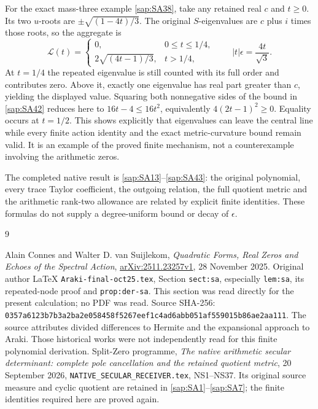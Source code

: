 \documentclass[11pt]{article}
\begin{document}
For the exact mass-three example \eqref{sap:SA38}, take
any retained real $c$ and $t\geq0$. Its two $u$-roots
are $\pm\sqrt{(1-4t)/3}$. The original $S$-eigenvalues
are $c$ plus $i$ times those roots, so the aggregate is
\begin{equation}\tag{SA43}\label{sap:SA43}
\mathcal L(t)=
\begin{cases}
0,&0\leq t\leq1/4,\\
2\sqrt{(4t-1)/3},&t>1/4,
\end{cases}
\qquad |t|\epsilon=\frac{4t}{\sqrt3}.
\end{equation}
At $t=1/4$ the repeated eigenvalue is still counted with
its full order and contributes zero. Above it, exactly
one eigenvalue has real part greater than $c$, yielding
the displayed value. Squaring both nonnegative sides
of the bound in \eqref{sap:SA42} reduces here to
$16t-4\leq16t^2$, equivalently
$4(2t-1)^2\geq0$. Equality occurs at $t=1/2$.
This shows explicitly that eigenvalues can leave the
central line while every finite action identity and
the exact metric-curvature bound remain valid.
It is an example of the proved finite mechanism,
not a counterexample involving the arithmetic zeros.

The completed native result is \eqref{sap:SA13}--\eqref{sap:SA43}:
the original polynomial, every trace Taylor coefficient,
the outgoing relation, the full quotient metric and
the arithmetic rank-two allowance are related by
explicit finite identities. These formulas do not
supply a degree-uniform bound or decay of $\epsilon$.

\begin{thebibliography}{9}\raggedright
{} Alain Connes and Walter D. van Suijlekom,
\emph{Quadratic Forms, Real Zeros and Echoes of the Spectral Action},
\href{https://arxiv.org/abs/2511.23257v1}{arXiv:2511.23257v1},
28 November 2025. Original author LaTeX
\texttt{Araki-final-oct25.tex}, Section \texttt{sect:sa},
especially \texttt{lem:sa}, its repeated-node proof and
\texttt{prop:der-sa}. This section was read directly for
the present calculation; no PDF was read. Source SHA-256:
\texttt{0357a6123b7b3a2ba2e058458f5267eef1c4ad6abb051af559015b86ae2aa111}.
The source attributes divided differences to Hermite
and the expansional approach to Araki. Those historical
works were not independently read for this finite
polynomial derivation.
 Split-Zero programme,
\emph{The native arithmetic secular determinant:
complete pole cancellation and the retained quotient metric},
20 September 2026, \texttt{NATIVE\_SECULAR\_RECEIVER.tex},
NS1--NS37. Its original source measure and cyclic
quotient are retained in \eqref{sap:SA1}--\eqref{sap:SA7};
the finite identities required here are proved again.
\end{thebibliography}
\end{document}
